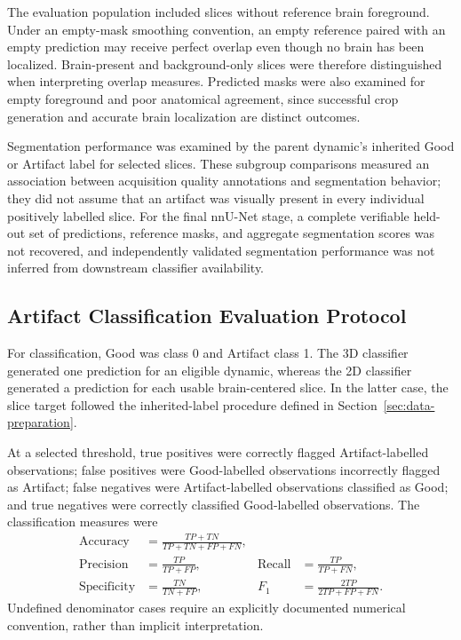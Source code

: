 The evaluation population included slices without reference brain foreground. Under an empty-mask smoothing convention, an empty reference paired with an empty prediction may receive perfect overlap even though no brain has been localized. Brain-present and background-only slices were therefore distinguished when interpreting overlap measures. Predicted masks were also examined for empty foreground and poor anatomical agreement, since successful crop generation and accurate brain localization are distinct outcomes.

Segmentation performance was examined by the parent dynamic's inherited Good or Artifact label for selected slices. These subgroup comparisons measured an association between acquisition quality annotations and segmentation behavior; they did not assume that an artifact was visually present in every individual positively labelled slice. For the final nnU-Net stage, a complete verifiable held-out set of predictions, reference masks, and aggregate segmentation scores was not recovered, and independently validated segmentation performance was not inferred from downstream classifier availability.

\subsection{Artifact Classification Evaluation Protocol}
\label{subsec:artifact-classification-evaluation}

For classification, Good was class 0 and Artifact class 1. The 3D classifier generated one prediction for an eligible dynamic, whereas the 2D classifier generated a prediction for each usable brain-centered slice. In the latter case, the slice target followed the inherited-label procedure defined in Section~\ref{sec:data-preparation}.

At a selected threshold, true positives were correctly flagged Artifact-labelled observations; false positives were Good-labelled observations incorrectly flagged as Artifact; false negatives were Artifact-labelled observations classified as Good; and true negatives were correctly classified Good-labelled observations. The classification measures were
\begin{align}
\mathrm{Accuracy} &= \frac{TP+TN}{TP+TN+FP+FN},\\
\mathrm{Precision} &= \frac{TP}{TP+FP}, &
\mathrm{Recall} &= \frac{TP}{TP+FN},\\
\mathrm{Specificity} &= \frac{TN}{TN+FP}, &
F_1 &= \frac{2TP}{2TP+FP+FN}.
\end{align}
Undefined denominator cases require an explicitly documented numerical convention, rather than implicit interpretation.

